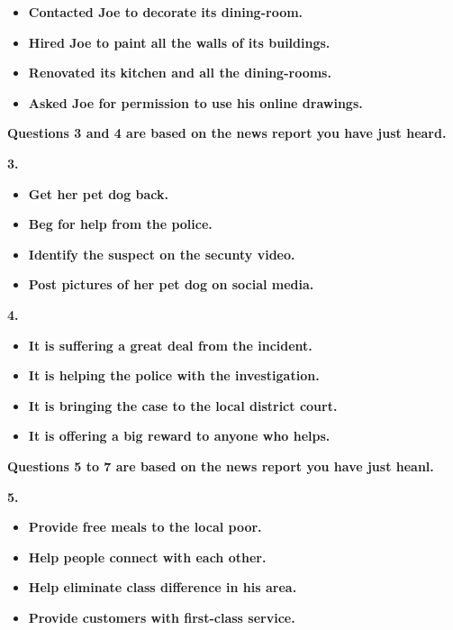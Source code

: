 \documentclass[UTF8,11pt]{ctexart}
\begin{document}
\begin{itemize}[leftmargin=2em,itemsep=.2em,topsep=.4em]\item[A.] \textbf{Contacted Joe to decorate its dining-room.}
\item[B.] \textbf{Hired Joe to paint all the walls of its buildings.}
\item[C.] \textbf{Renovated its kitchen and all the dining-rooms.}
\item[D.] \textbf{Asked Joe for permission to use his online drawings.}
\end{itemize}

\textbf{Questions 3 and 4 are based on the news report you have just heard.}


\textbf{3.}


\begin{itemize}[leftmargin=2em,itemsep=.2em,topsep=.4em]\item[A.] \textbf{Get her pet dog back.}
\item[B.] \textbf{Beg for help from the police.}
\item[C.] \textbf{Identify the suspect on the secunty video.}
\item[D.] \textbf{Post pictures of her pet dog on social media.}
\end{itemize}

\textbf{4.}


\begin{itemize}[leftmargin=2em,itemsep=.2em,topsep=.4em]\item[A.] \textbf{It is suffering a great deal from the incident.}
\item[B.] \textbf{It is helping the police with the investigation.}
\item[C.] \textbf{It is bringing the case to the local district court.}
\item[D.] \textbf{It is offering a big reward to anyone who helps.}
\end{itemize}

\textbf{Questions 5 to 7 are based on the news report you have just heanl.}


\textbf{5.}


\begin{itemize}[leftmargin=2em,itemsep=.2em,topsep=.4em]\item[A.] \textbf{Provide free meals to the local poor.}
\item[B.] \textbf{Help people connect with each other.}
\item[C.] \textbf{Help eliminate class difference in his area.}
\item[D.] \textbf{Provide customers with first-class service.}
\end{itemize}
\end{document}
